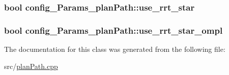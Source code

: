 \subsubsection[{\texorpdfstring{use\+\_\+rrt\+\_\+star}{use_rrt_star}}]{\setlength{\rightskip}{0pt plus 5cm}bool config\+\_\+\+Params\+\_\+plan\+Path\+::use\+\_\+rrt\+\_\+star}\hypertarget{classconfig__Params__planPath_a88d2ed829eea295da08035b2e337a034}{}\label{classconfig__Params__planPath_a88d2ed829eea295da08035b2e337a034}
\subsubsection[{\texorpdfstring{use\+\_\+rrt\+\_\+star\+\_\+ompl}{use_rrt_star_ompl}}]{\setlength{\rightskip}{0pt plus 5cm}bool config\+\_\+\+Params\+\_\+plan\+Path\+::use\+\_\+rrt\+\_\+star\+\_\+ompl}\hypertarget{classconfig__Params__planPath_a75a7e08f13b232240c5e6a226e34f333}{}\label{classconfig__Params__planPath_a75a7e08f13b232240c5e6a226e34f333}


The documentation for this class was generated from the following file\+:\begin{DoxyCompactItemize}
\item 
src/\hyperlink{planPath_8cpp}{plan\+Path.\+cpp}\end{DoxyCompactItemize}
